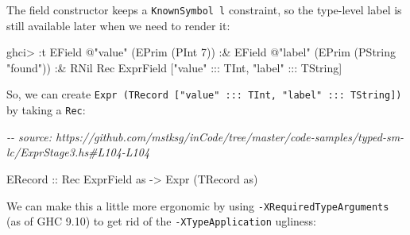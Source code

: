 \documentclass[]{article}
\newenvironment{Shaded}{}{}
\newcommand{\CommentTok}[1]{\textcolor[rgb]{0.38,0.63,0.69}{\textit{#1}}}
\newcommand{\DataTypeTok}[1]{\textcolor[rgb]{0.56,0.13,0.00}{#1}}
\newcommand{\DecValTok}[1]{\textcolor[rgb]{0.25,0.63,0.44}{#1}}
\newcommand{\NormalTok}[1]{#1}
\newcommand{\OperatorTok}[1]{\textcolor[rgb]{0.40,0.40,0.40}{#1}}
\newcommand{\OtherTok}[1]{\textcolor[rgb]{0.00,0.44,0.13}{#1}}
\newcommand{\StringTok}[1]{\textcolor[rgb]{0.25,0.44,0.63}{#1}}
\begin{document}
The field constructor keeps a \texttt{KnownSymbol\ l} constraint, so the
type-level label is still available later when we need to render it:

\begin{Shaded}
\begin{Highlighting}[]
\NormalTok{ghci}\OperatorTok{\textgreater{}} \OperatorTok{:}\NormalTok{t }\DataTypeTok{EField} \OperatorTok{@}\StringTok{"value"}\NormalTok{ (}\DataTypeTok{EPrim}\NormalTok{ (}\DataTypeTok{PInt} \DecValTok{7}\NormalTok{))}
            \OperatorTok{:\&} \DataTypeTok{EField} \OperatorTok{@}\StringTok{"label"}\NormalTok{ (}\DataTypeTok{EPrim}\NormalTok{ (}\DataTypeTok{PString} \StringTok{"found"}\NormalTok{))}
            \OperatorTok{:\&} \DataTypeTok{RNil}
\DataTypeTok{Rec} \DataTypeTok{ExprField}\NormalTok{ [}\StringTok{"value"} \OperatorTok{:::} \DataTypeTok{TInt}\NormalTok{, }\StringTok{"label"} \OperatorTok{:::} \DataTypeTok{TString}\NormalTok{]}
\end{Highlighting}
\end{Shaded}

So, we can create
\texttt{Expr\ (TRecord\ {[}"value"\ :::\ TInt,\ "label"\ :::\ TString{]})} by
taking a \texttt{Rec}:

\begin{Shaded}
\begin{Highlighting}[]
\CommentTok{{-}{-} source: https://github.com/mstksg/inCode/tree/master/code{-}samples/typed{-}sm{-}lc/ExprStage3.hs\#L104{-}L104}

  \DataTypeTok{ERecord}\OtherTok{ ::} \DataTypeTok{Rec} \DataTypeTok{ExprField}\NormalTok{ as }\OtherTok{{-}\textgreater{}} \DataTypeTok{Expr}\NormalTok{ (}\DataTypeTok{TRecord}\NormalTok{ as)}
\end{Highlighting}
\end{Shaded}

We can make this a little more ergonomic by using
\texttt{-XRequiredTypeArguments} (as of GHC 9.10) to get rid of the
\texttt{-XTypeApplication} ugliness:
\end{document}
